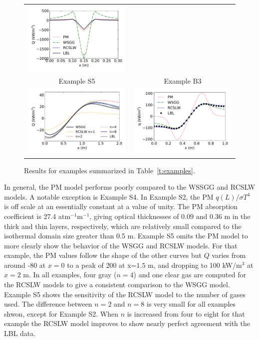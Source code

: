 \documentclass[preprint,12pt, a4paper]{elsarticle}
\begin{document}
\begin{figure}
\begin{center}
\begin{tabular}{c c}
        \includegraphics[width=3 in]{ex_4a.pdf} \\
        Example S5 & Example B3 \\
        \includegraphics[width=3 in]{ex_5b.pdf} &
        \includegraphics[width=3 in]{ex_6.pdf}
    \end{tabular}
    \caption{Results for examples summarized in Table~\ref{t:examples}.}
    \label{f:examples}
    \end{center}
\end{figure}
%
In general, the PM model performs poorly compared to the WSSGG and RCSLW models. A notable exception is Example S4. In Example S2, the PM $q(L)/\sigma T^4$ is off scale at an essentially constant at a value of unity. The PM absorption coefficient is 27.4 atm$^{-1}$m$^{-1}$, giving optical thicknesses of 0.09 and 0.36 m in the thick and thin layers, respectively, which are relatively small compared to the isothermal domain size greater than 0.5 m. Example S5 omits the PM model to more clearly show the behavior of the WSGG and RCSLW models. For that example, the PM values follow the shape of the other curves but $Q$ varies from around -80 at $x=0$ to a peak of 200 at x=$1.5$ m, and dropping to 100 kW/m$^3$ at $x=2$ m. In all examples, four gray ($n=4$) and one clear gas are computed for the RCSLW models to give a consistent comparison to the WSGG model. Example S5 shows the sensitivity of the RCSLW model to the number of gases used. The difference between $n=2$ and $n=8$ is very small for all examples shwon, except for Example S2. When $n$ is increased from four to eight for that example the RCSLW model improves to show nearly perfect agreement with the LBL data.
\end{document}
